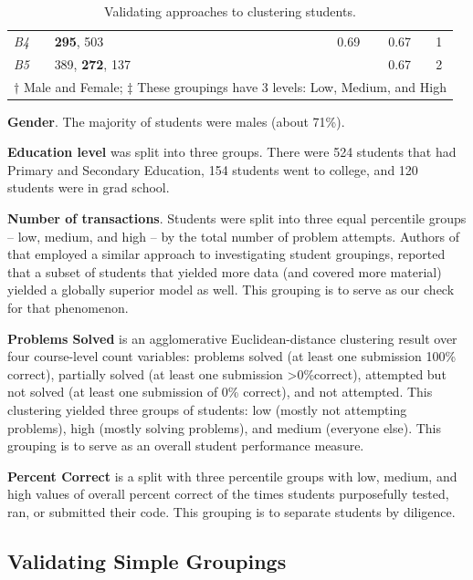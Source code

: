 \documentclass{sigchi}
\begin{document}
\begin{table}[h]
\begin{tabular}{ll|cccc|ccccc|cc}
\small\textit{B4}       & {\textbf{295}, 503}     & & & &  &        &        &        &       & 0.69  & 0.67  & 1 \\
\small\textit{B5}       & {389, \textbf{272}, 137} & & & & &        &        &        &       &       & 0.67  & 2 \\ 
\bottomrule
\multicolumn{13}{l}{\footnotesize $\dagger$ Male and Female; $\ddagger$ These groupings have 3 levels: Low, Medium, and High}
\end{tabular}
\caption{Validating approaches to clustering students.}\vspace{-10pt}
\label{table:behavior-groups}
\end{table}

\textbf{Gender}. The majority of students were males (about 71\%).

\textbf{Education level} was split into three groups. There were 524 students that had Primary and Secondary Education, 154 students went to college, and 120 students were in grad school.

\textbf{Number of transactions}. Students were split into three equal percentile groups -- low, medium, and high -- by the total number of problem attempts. Authors of \cite{yudelson2014bdbbd} that employed a similar approach to investigating student groupings, reported that a subset of students that yielded more data (and covered more material) yielded a globally superior model as well. This grouping is to serve as our check for that phenomenon. 

\textbf{Problems Solved} is an agglomerative Euclidean-distance clustering result over four course-level count variables: problems solved (at least one submission 100\% correct), partially solved (at least one submission >0\%correct), attempted but not solved (at least one submission of 0\% correct), and not attempted. This clustering yielded three groups of students: low (mostly not attempting problems), high (mostly solving problems), and medium (everyone else). This grouping is to serve as an overall student performance measure.

\textbf{Percent Correct} is a split with three percentile groups with low, medium, and high values of overall percent correct of the times students purposefully tested, ran, or submitted their code. This grouping is to separate students by diligence.

\subsection{Validating Simple Groupings}
\end{document}
